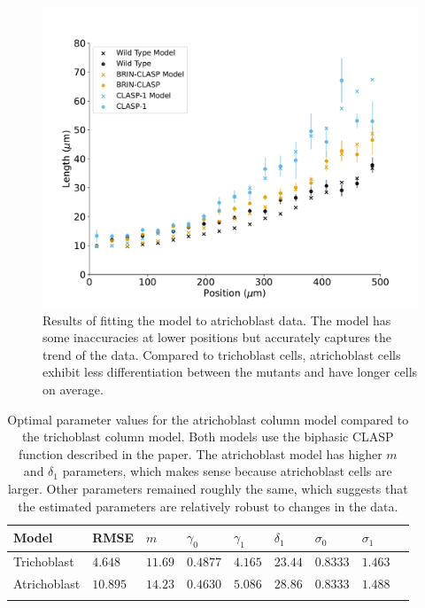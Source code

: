 \documentclass[referee,pdflatex,sn-mathphys-num]{sn-jnl}
\begin{document}
\begin{appendices}
\begin{figure}
  \centering
  \includegraphics[width=\textwidth]{column-atrichoblast-fit.pdf}
  \caption{Results of fitting the model to atrichoblast data. The model has some inaccuracies at lower positions but accurately captures the trend of the data. Compared to trichoblast cells, atrichoblast cells exhibit less differentiation between the mutants and have longer cells on average. }
  \label{column-atrichoblast-fit}
\end{figure}

\begin{table}[!ht]
\centering
\label{column-atrichoblast-parameters}
\begin{tabular}{@{}lllllllll@{}}
\toprule
Model & RMSE & $m$ & $\gamma_{0}$ & $\gamma_{1}$ & $\delta_{1}$ & $\sigma_{0}$ & $\sigma_{1}$ \\
\midrule
Trichoblast & $4.648$ & $11.69$ & $0.4877$ & $4.165$ & $23.44$ & $0.8333$ & $1.463$ \\
Atrichoblast & $10.895$ & $14.23$ & $0.4630$ & $5.086$ & $28.86$ & $0.8333$ & $1.488$ \\
\botrule
\caption{Optimal parameter values for the atrichoblast column model compared to the trichoblast column model. Both models use the biphasic CLASP function described in the paper. The atrichoblast model has higher $m$ and $\delta_{1}$ parameters, which makes sense because atrichoblast cells are larger. Other parameters remained roughly the same, which suggests that the estimated parameters are relatively robust to changes in the data.} 

\end{tabular}
\end{table}

\end{appendices}
\end{document}
